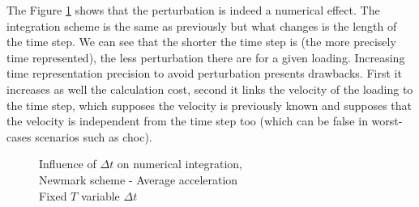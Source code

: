 \documentclass[12pt,a4paper]{article}
\begin{document}
The Figure \ref{InfluenceTimestepOnIntegration} shows that the perturbation is indeed a numerical effect. The integration scheme is the same as previously but what changes is the length of the time step. We can see that the shorter the time step is (the more precisely time represented), the less perturbation there are for a given loading. Increasing time representation precision to avoid perturbation presents drawbacks. First it increases as well the calculation cost, second it links the velocity of the loading to the time step, which supposes the velocity is previously known and supposes that the velocity is independent from the time step too (which can be false in worst-cases scenarios such as choc).
\begin{figure}[!ht]
\centering
{}
\hspace{0.5cm}
\hspace{0.5cm}
\caption{Influence of $\Delta t$ on numerical integration, 
\\ Newmark scheme - Average acceleration 
\\ Fixed $T$ variable $\Delta t$
\label{InfluenceTimestepOnIntegration}}
\end{figure}
\end{document}
